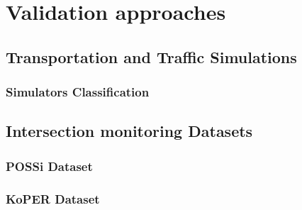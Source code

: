 \section{Validation approaches}
\subsection{Transportation and Traffic Simulations}
\subsubsection{Simulators Classification}
\subsection{Intersection monitoring Datasets}
\subsubsection{POSSi Dataset}
\subsubsection{KoPER Dataset}